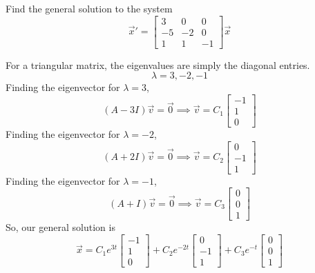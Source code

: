 \begin{example}
	Find the general solution to the system
	\begin{equation*}
		\vec{x}' = \begin{bmatrix}
			3 & 0 & 0 \\
			-5 & -2 & 0 \\
			1 & 1 & -1
		\end{bmatrix} \vec{x}
	\end{equation*}
\end{example}
\noindent
For a triangular matrix, the eigenvalues are simply the diagonal entries.
\begin{equation*}
	\lambda = 3, -2, -1
\end{equation*}
Finding the eigenvector for $\lambda = 3$,
\begin{equation*}
	(A - 3I)\vec{v} = \vec{0} \implies \vec{v} = C_1\begin{bmatrix}
		-1 \\
		1 \\
		0
	\end{bmatrix}
\end{equation*}
Finding the eigenvector for $\lambda = -2$,
\begin{equation*}
	(A + 2I)\vec{v} = \vec{0} \implies \vec{v} = C_2\begin{bmatrix}
		0 \\
		-1 \\
		1
	\end{bmatrix}
\end{equation*}
Finding the eigenvector for $\lambda = -1$,
\begin{equation*}
	(A + I)\vec{v} = \vec{0} \implies \vec{v} = C_3\begin{bmatrix}
		0 \\
		0 \\
		1
	\end{bmatrix}
\end{equation*}
So, our general solution is
\begin{equation*}
	\vec{x} = C_1e^{3t}\begin{bmatrix}
		-1 \\
		1 \\
		0
	\end{bmatrix} + C_2e^{-2t}\begin{bmatrix}
		0 \\
		-1 \\
		1
	\end{bmatrix} + C_3e^{-t}\begin{bmatrix}
		0 \\
		0 \\
		1
	\end{bmatrix}
\end{equation*}